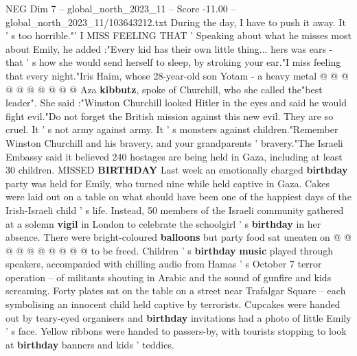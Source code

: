 \begin{textsample}{NEG Dim 7 – global\_north\_2023\_11 – Score -11.00 – global\_north\_2023\_11/103643212.txt}
During the day, I have to push it away.
It ' s too horrible."' I MISS FEELING THAT ' Speaking about what he misses most about Emily, he added :"Every kid has their own little thing... hers was ears - that ' s how she would send herself to sleep, by stroking your ear."I miss feeling that every night."Iris Haim, whose 28-year-old son Yotam - a heavy metal @ @ @ @ @ @ @ @ @ @ Aza \textbf{kibbutz}, spoke of Churchill, who she called the"best leader".
She said :"Winston Churchill looked Hitler in the eyes and said he would fight evil."Do not forget the British mission against this new evil.
They are so cruel.
It ' s not army against army.
It ' s monsters against children."Remember Winston Churchill and his bravery, and your grandparents ' bravery."The Israeli Embassy said it believed 240 hostages are being held in Gaza, including at least 30 children.
MISSED \textbf{BIRTHDAY} Last week an emotionally charged \textbf{birthday} party was held for Emily, who turned nine while held captive in Gaza.
Cakes were laid out on a table on what should have been one of the happiest days of the Irish-Israeli child ' s life.
Instead, 50 members of the Israeli community gathered at a solemn \textbf{vigil} in London to celebrate the schoolgirl ' s \textbf{birthday} in her absence.
There were bright-coloured \textbf{balloons} but party food sat uneaten on @ @ @ @ @ @ @ @ @ @ to be freed.
Children ' s \textbf{birthday} \textbf{music} played through speakers, accompanied with chilling audio from Hamas ' s October 7 terror operation -- of militants shouting in Arabic and the sound of gunfire and kids screaming.
Forty plates sat on the table on a street near Trafalgar Square -- each symbolising an innocent child held captive by terrorists.
Cupcakes were handed out by teary-eyed organisers and \textbf{birthday} invitations had a photo of little Emily ' s face.
Yellow ribbons were handed to passers-by, with tourists stopping to look at \textbf{birthday} banners and kids ' teddies.

\end{textsample}
